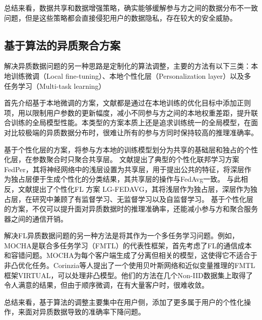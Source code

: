 总结来看，数据共享和数据增强策略，确实能够缓解参与方之间的数据分布不一致问题，但是这些策略都会直接侵犯用户的数据隐私，存在较大的安全威胁。

\subsection{基于算法的异质聚合方案}
解决异质数据问题的另一种思路是定制化的算法调整，主要的方法有以下三类：本地训练微调（Local fine-tuning）\cite{hanzely2020federated, t2020personalized, huang2021personalized}、本地个性化层（Personalization layer）以及多任务学习（Multi-task learning）

首先介绍基于本地微调的方案，文献\cite{li2020federated, hanzely2020federated, t2020personalized, huang2021personalized}都是通过在本地训练的优化目标中添加正则项，用以限制用户参数的更新幅度，减小不同参与方之间的本地权重差距，提升联合训练的全局模型性能。本类型的方案本质上还是追求训练统一的全局模型，在面对比较极端的异质数据分布时，很难让所有的参与方同时保持较高的推理准确率。

基于个性化层的方案，将参与方本地的训练模型划分为共享的基础层和独占的个性化层，在参数聚合时只聚合共享层。
文献\cite{arivazhagan2019federated}提出了典型的个性化联邦学习方案FedPer，其将神经网络中的浅层设置为共享层，用于提出公共的特征，将深层作为独占层便于生成个性化的分类结果，其共享层的操作与FedAvg一致。
与此相反，文献\cite{liang2020think}提出了个性化FL
方案 LG-FEDAVG，其将浅层作为独占层，深层作为独占层，在研究中兼顾了有监督学习、无监督学习以及自监督学习。
基于个性化层的方案，不仅可以提升面对异质数据时的推理准确率，还能减小参与方和聚合服务器之间的通信开销。

解决FL异质数据问题的另一种方法是将其作为一个多任务学习问题。例如，MOCHA\cite{smith2017federated}是联合多任务学习（FMTL）的代表性框架，首先考虑了FL的通信成本和容错问题。MOCHA为每个客户端生成了分离但相关的模型，这使得它不适合于非凸优化任务。Corinzia等人\cite{corinzia2019variational}提出了一个使用贝叶斯网络和近似变量推理的FMTL框架VIRTUAL，可以处理非凸模型。他们的方法在几个Non-IID数据集上取得了令人满意的结果，但由于顺序微调，在有大量客户时，很难收敛。


总结来看，基于算法的调整主要集中在用户侧，添加了更多属于用户的个性化操作，来面对异质数据导致的准确率下降问题。

